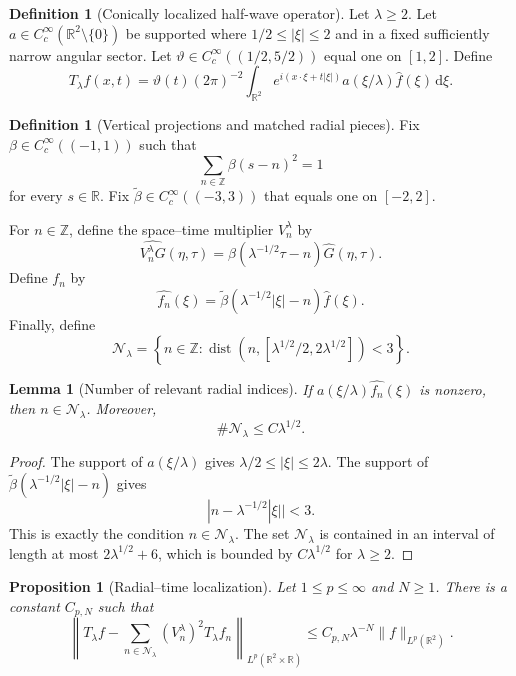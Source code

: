 \documentclass[11pt]{article}
\numberwithin{equation}{section}
\newtheorem{proposition}[theorem]{Proposition}
\newtheorem{lemma}[theorem]{Lemma}
\theoremstyle{definition}
\newtheorem{definition}[theorem]{Definition}
\theoremstyle{remark}
\newcommand{\R}{\mathbb R}
\newcommand{\Z}{\mathbb Z}
\newcommand{\dist}{\operatorname{dist}}
\newcommand{\dd}{\,\mathrm d}
\begin{document}
\begin{definition}[Conically localized half-wave operator]\label{def:conic-operator}
Let $\lambda\ge2$.  Let $a\in C_c^\infty(\R^2\setminus\{0\})$ be supported where $1/2\le|\xi|\le2$ and in a fixed sufficiently narrow angular sector.  Let $\vartheta\in C_c^\infty((1/2,5/2))$ equal one on $[1,2]$.  Define
\[
T_\lambda f(x,t)=\vartheta(t)(2\pi)^{-2}\int_{\R^2}e^{i(x\cdot\xi+t|\xi|)}a(\xi/\lambda)\widehat f(\xi)\dd\xi.
\]
\end{definition}

\begin{definition}[Vertical projections and matched radial pieces]\label{def:mss-radial-vertical}
Fix $\beta\in C_c^\infty((-1,1))$ such that
\[
\sum_{n\in\Z}\beta(s-n)^2=1
\]
for every $s\in\R$.  Fix $\widetilde\beta\in C_c^\infty((-3,3))$ that equals one on $[-2,2]$.

For $n\in\Z$, define the space--time multiplier $V_n^\lambda$ by
\[
\widehat{V_n^\lambda G}(\eta,\tau)
=\beta(\lambda^{-1/2}\tau-n)\widehat G(\eta,\tau).
\]
Define $f_n$ by
\[
\widehat{f_n}(\xi)=\widetilde\beta(\lambda^{-1/2}|\xi|-n)\widehat f(\xi).
\]
Finally, define
\[
\mathcal N_\lambda
=\left\{n\in\Z:\dist\!\left(n,[\lambda^{1/2}/2,2\lambda^{1/2}]\right)<3\right\}.
\]
\end{definition}

\begin{lemma}[Number of relevant radial indices]\label{lem:mss-relevant-indices}
If $a(\xi/\lambda)\widehat{f_n}(\xi)$ is nonzero, then $n\in\mathcal N_\lambda$.  Moreover,
\[
\#\mathcal N_\lambda\le C\lambda^{1/2}.
\]
\end{lemma}

\begin{proof}
The support of $a(\xi/\lambda)$ gives $\lambda/2\le|\xi|\le2\lambda$.  The support of $\widetilde\beta(\lambda^{-1/2}|\xi|-n)$ gives
\[
|n-\lambda^{-1/2}|\xi||<3.
\]
This is exactly the condition $n\in\mathcal N_\lambda$.  The set $\mathcal N_\lambda$ is contained in an interval of length at most $2\lambda^{1/2}+6$, which is bounded by $C\lambda^{1/2}$ for $\lambda\ge2$.
\end{proof}

\begin{proposition}[Radial--time localization]\label{prop:mss-radial-time-localization}
Let $1\le p\le\infty$ and $N\ge1$.  There is a constant $C_{p,N}$ such that
\[
\left\|T_\lambda f-
\sum_{n\in\mathcal N_\lambda}(V_n^\lambda)^2T_\lambda f_n
\right\|_{L^p(\R^2\times\R)}
\le C_{p,N}\lambda^{-N}\|f\|_{L^p(\R^2)}.
\]
\end{proposition}
\end{document}
